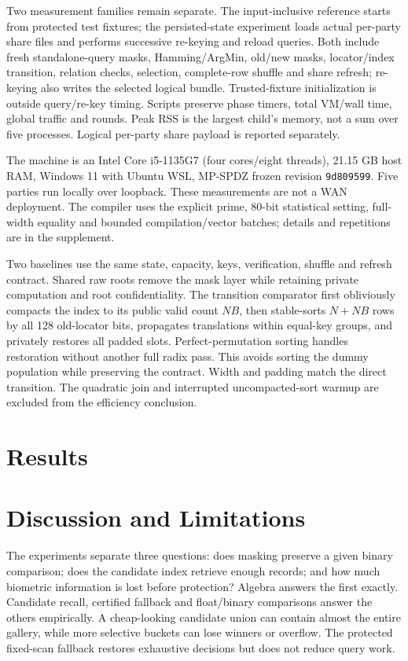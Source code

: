 \documentclass[journal]{IEEEtran}
\begin{document}
Two measurement families remain separate. The input-inclusive reference starts from protected test fixtures; the persisted-state experiment loads actual per-party share files and performs successive re-keying and reload queries. Both include fresh standalone-query masks, Hamming/ArgMin, old/new masks, locator/index transition, relation checks, selection, complete-row shuffle and share refresh; re-keying also writes the selected logical bundle. Trusted-fixture initialization is outside query/re-key timing. Scripts preserve phase timers, total VM/wall time, global traffic and rounds. Peak RSS is the largest child's memory, not a sum over five processes. Logical per-party share payload is reported separately.

The machine is an Intel Core i5-1135G7 (four cores/eight threads), 21.15 GB host RAM, Windows 11 with Ubuntu WSL, MP-SPDZ frozen revision \texttt{9d809599}. Five parties run locally over loopback. These measurements are not a WAN deployment. The compiler uses the explicit prime, 80-bit statistical setting, full-width equality and bounded compilation/vector batches; details and repetitions are in the supplement.

Two baselines use the same state, capacity, keys, verification, shuffle and refresh contract. Shared raw roots remove the mask layer while retaining private computation and root confidentiality. The transition comparator first obliviously compacts the index to its public valid count $NB$, then stable-sorts $N+NB$ rows by all 128 old-locator bits, propagates translations within equal-key groups, and privately restores all padded slots. Perfect-permutation sorting handles restoration without another full radix pass. This avoids sorting the dummy population while preserving the contract. Width and padding match the direct transition. The quadratic join and interrupted uncompacted-sort warmup are excluded from the efficiency conclusion.

\section{Results}\label{sec:results}


\section{Discussion and Limitations}\label{sec:discussion}
The experiments separate three questions: does masking preserve a given binary comparison; does the candidate index retrieve enough records; and how much biometric information is lost before protection? Algebra answers the first exactly. Candidate recall, certified fallback and float/binary comparisons answer the others empirically. A cheap-looking candidate union can contain almost the entire gallery, while more selective buckets can lose winners or overflow. The protected fixed-scan fallback restores exhaustive decisions but does not reduce query work.
\end{document}

